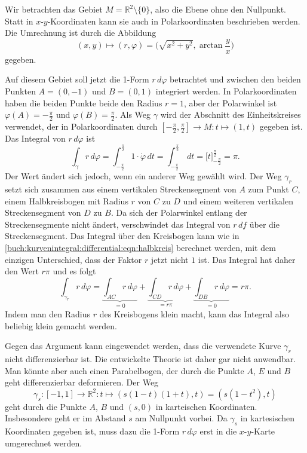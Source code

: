 \begin{beispiel}

Wir betrachten das Gebiet $M=\mathbb{R}^2\setminus\{0\}$, also die
Ebene ohne den Nullpunkt.
Statt in $x$-$y$-Koordinaten kann sie auch in Polarkoordinaten
beschrieben werden.
Die Umrechnung ist durch die Abbildung
\[
(x,y) \mapsto (r,\varphi)=\biggl(\sqrt{x^2+y^2},\arctan\frac{y}{x}\biggr)
\]
gegeben.

Auf diesem Gebiet soll jetzt die 1-Form $r\,d\varphi$ betrachtet und
zwischen den beiden Punkten $A=(0,-1)$ und $B=(0,1)$ integriert werden.
In Polarkoordinaten haben die beiden Punkte beide den Radius $r=1$,
aber der Polarwinkel ist $\varphi(A) = -\frac{\pi}2$ und
$\varphi(B)=\frac{\pi}2$.
Als Weg $\gamma$ wird der Abschnitt des Einheitskreises verwendet, der in
Polarkoordinaten durch $[-\frac{\pi}2,\frac{\pi}2]\to M:t\mapsto (1,t)$ 
gegeben ist.
Das Integral von $r\,d\varphi$ ist
\begin{equation}
\int_{\gamma} r\,d\varphi
=
\int_{-\frac{\pi}2}^{\frac{\pi}2}
1\cdot \dot{\varphi}\,dt
=
\int_{-\frac{\pi}2}^{\frac{\pi}2}\,dt
=
\bigl[t\bigr]_{-\frac{\pi}2}^{\frac{\pi}2}
=
\pi.
\label{buch:kurvenintegral:differential:eqn:halbkreis}
\end{equation}
Der Wert ändert sich jedoch, wenn ein anderer Weg gewählt wird.
Der Weg $\gamma_r$ setzt sich zusammen aus einem vertikalen
Streckensegment von $A$ zum Punkt $C$, einem Halbkreisbogen mit
Radius $r$ von $C$ zu $D$ und einem weiteren vertikalen Streckensegment
von $D$ zu $B$.
Da sich der Polarwinkel entlang der Streckensegmente nicht ändert,
verschwindet das Integral von $r\,df$ über die Streckensegment.
Das Integral über den Kreisbogen kann wie in 
\eqref{buch:kurvenintegral:differential:eqn:halbkreis}
berechnet werden, mit dem einzigen Unterschied, dass der Faktor $r$
jetzt nicht $1$ ist.
Das Integral hat daher den Wert $r\pi$ und es folgt
\[
\int_{\gamma_r} r\,d\varphi
=
\underbrace{\int_{AC} r\,d\varphi}_{\displaystyle = 0}
+
\underbrace{\int_{CD} r\,d\varphi}_{\displaystyle = r\pi}
+
\underbrace{\int_{DB} r\,d\varphi}_{\displaystyle = 0}
=
r\pi.
\]
Indem man den Radius $r$ des Kreisbogens klein macht, kann das Integral
also beliebig klein gemacht werden.

Gegen das Argument kann eingewendet werden, dass die verwendete 
Kurve $\gamma_r$ nicht differenzierbar ist.
Die entwickelte Theorie ist daher gar nicht anwendbar.
Man könnte aber auch einen Parabelbogen, der durch die Punkte 
$A$, $E$ und $B$ geht differenzierbar deformieren.
Der Weg 
\[
\gamma_s
\colon
[-1,1]
\to
\mathbb{R}^2
:
t\mapsto (s(1-t)(1+t), t)=(s(1-t^2),t)
\]
geht durch die Punkte $A$, $B$ und $(s,0)$ in karteischen
Koordinaten.
Insbesondere geht er im Abstand $s$ am Nullpunkt vorbei.
Da $\gamma_s$ in kartesischen Koordinaten gegeben ist, muss
dazu die 1-Form $r\,d\varphi$ erst in die $x$-$y$-Karte umgerechnet
werden.


\end{beispiel}
